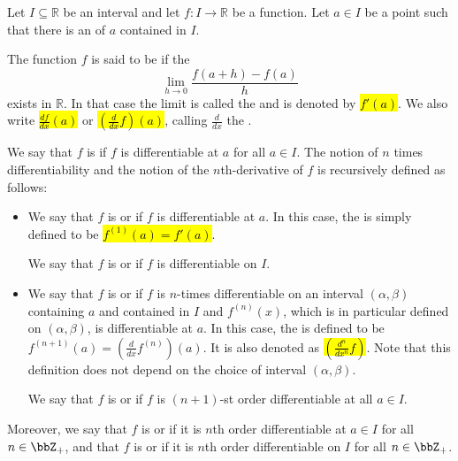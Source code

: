 \begin{definition} \label{definition:derivative_of_a_real_valued_function_on_a_real_interval}
    Let $I \subseteq \mathbb{R}$ be an interval and let $f : I \to \mathbb{R}$ be a function. Let $a \in I$ be a point such that there is an  of $a$ contained in $I$.

    The function $f$ is said to be  if the 
    $$\lim_{h\to 0} \frac{f(a+h) - f(a)}{h}$$
    exists in $\mathbb{R}$.
    In that case the limit is called the  and is denoted by \hl{$f'(a)$}. We also write \hl{$\frac{df}{dx}(a)$} or \hl{$\left(\frac{d}{dx} f\right)(a)$}, calling $\frac{d}{dx}$ the . 

    We say that $f$ is  if $f$ is differentiable at $a$ for all $a \in I$. The notion of $n$ times differentiability and the notion of the $n$th-derivative of $f$ is recursively defined as follows:
    \begin{itemize}
        \item We say that $f$ is  or  if $f$ is differentiable at $a$. In this case, the  is simply defined to be \hl{$f^{(1)}(a) = f'(a)$}.

        We say that $f$ is  or  if $f$ is differentiable on $I$.

        \item We say that $f$ is  or  if $f$ is $n$-times differentiable on an interval $(\alpha, \beta)$ containing $a$ and contained in $I$ and $f^{(n)}(x)$, which is in particular defined on $(\alpha, \beta)$,  is differentiable at $a$. In this case, the  is defined to be $f^{(n+1)}(a) = \left( \frac{d}{dx} f^{(n)} \right)(a)$. It is also denoted as \hl{$\left( \frac{d^n}{dx^n} f \right)$}. Note that this definition does not depend on the choice of interval $(\alpha, \beta)$. 

        We say that $f$ is  or  if $f$ is $(n+1)$-st order differentiable at all $a \in I$.
    \end{itemize}

    Moreover, we say that $f$ is  or  if it is $n$th order differentiable at $a \in I$ for all $n \in \bbZ_+$, and that $f$ is  or  if it is $n$th order differentiable on $I$ for all $n \in \bbZ_+$.
\end{definition}